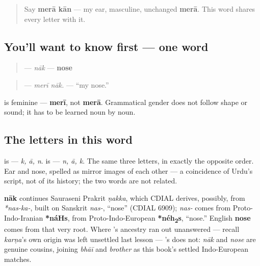 \label{lesson:UR-C10-naak}



\begin{quote}
Say \textbf{merā kān} — my ear, masculine, unchanged \textbf{merā}. This word shares every letter with it.
\end{quote}

\subsection*{You'll want to know first — one word}
\begin{quote}
\textbf{} — \emph{nāk} — \textbf{nose}
\end{quote}

\begin{quote}
\textbf{ } — \emph{merī nāk.} — \textquotedblleft{}my nose.\textquotedblright{}
\end{quote}

\textbf{} is feminine — \textbf{merī}, not \textbf{merā}. Grammatical gender does not follow shape or sound; it has to be learned noun by noun.

\subsection*{The letters in this word}
\textbf{} is \textbf{  } — \emph{k, ā, n}. \textbf{} is \textbf{  } — \emph{n, ā, k}. The same three letters, in exactly the opposite order. Ear and nose, spelled as mirror images of each other — a coincidence of Urdu's script, not of its history; the two words are not related.

\begin{cousinweb}
\textbf{nāk} continues Sauraseni Prakrit \emph{ṇakka}, which CDIAL derives, possibly, from \emph{*nas-ka-}, built on Sanskrit \emph{nas-}, \textquotedblleft{}nose\textquotedblright{} (CDIAL 6909); \emph{nas-} comes from Proto-Indo-Iranian \textbf{*náHs}, from Proto-Indo-European \textbf{*néh\textsubscript{2}s}, \textquotedblleft{}nose.\textquotedblright{} English \textbf{nose} comes from that very root. Where \textbf{}'s ancestry ran out unanswered — recall \emph{karṇa}'s own origin was left unsettled last lesson — \textbf{}'s does not: \emph{nāk} and \emph{nose} are genuine cousins, joining \emph{bhāī} and \emph{brother} as this book's settled Indo-European matches.
\end{cousinweb}

